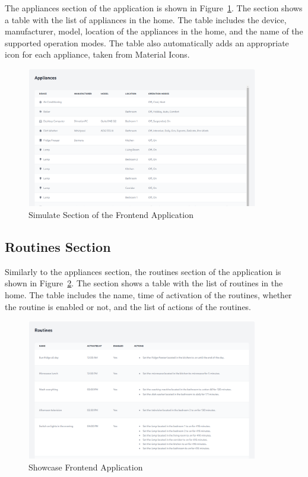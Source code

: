 The appliances section of the application is shown in Figure~\ref{fig:frontend_appliances}. The section shows a table with the list of appliances in the home. The table includes the device, manufacturer, model, location of the appliances in the home, and the name of the supported operation modes. The table also automatically adds an appropriate icon for each appliance, taken from Material Icons.

\begin{figure}
    \centering
    \includegraphics[width=0.9\textwidth]{images/frontend/appliances.png}
    \caption{Simulate Section of the Frontend Application}
    \label{fig:frontend_appliances}
\end{figure}

\subsection{Routines Section}

Similarly to the appliances section, the routines section of the application is shown in Figure~\ref{fig:frontend_routines}. The section shows a table with the list of routines in the home. The table includes the name, time of activation of the routines, whether the routine is enabled or not, and the list of actions of the routines.

\begin{figure}
    \centering
    \includegraphics[width=0.9\textwidth]{images/frontend/routines.png}
    \caption{Showcase Frontend Application}
    \label{fig:frontend_routines}
\end{figure}